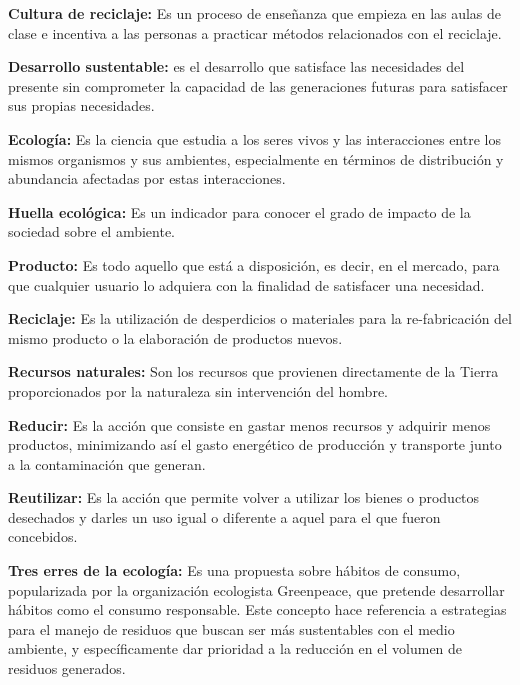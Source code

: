 \textbf{Cultura de reciclaje:} Es un proceso de enseñanza que empieza en las aulas de clase e incentiva a las personas a practicar métodos relacionados con el reciclaje.

\textbf{Desarrollo sustentable:} es el desarrollo que satisface las necesidades del presente sin comprometer la capacidad de las generaciones futuras para satisfacer sus propias necesidades.

\textbf{Ecología:} Es la ciencia que estudia a los seres vivos y las interacciones entre los mismos organismos y sus ambientes, especialmente en términos de distribución y abundancia afectadas por estas interacciones.

\textbf{Huella ecológica:} Es un indicador para conocer el grado de impacto de la sociedad sobre el ambiente.

\textbf{Producto:} Es todo aquello que está a disposición, es decir, en el mercado, para que cualquier usuario lo adquiera con la finalidad de satisfacer una necesidad.

\textbf{Reciclaje:} Es la utilización de desperdicios o materiales para la re-fabricación del mismo producto o la elaboración de productos nuevos.

\textbf{Recursos naturales:} Son los recursos que provienen directamente de la Tierra proporcionados por la naturaleza sin intervención del hombre.

\textbf{Reducir:} Es la acción que consiste en gastar menos recursos y adquirir menos productos, minimizando así el gasto energético de producción y transporte junto a la contaminación que generan.

\textbf{Reutilizar:} Es la acción que permite volver a utilizar los bienes o productos desechados y darles un uso igual o diferente a aquel para el que fueron concebidos.

\textbf{Tres erres de la ecología:} Es una propuesta sobre hábitos de consumo, popularizada por la organización ecologista Greenpeace, que pretende desarrollar hábitos como el consumo responsable. Este concepto hace referencia a estrategias para el manejo de residuos que buscan ser más sustentables con el medio ambiente, y específicamente dar prioridad a la reducción en el volumen de residuos generados.

\newpage
